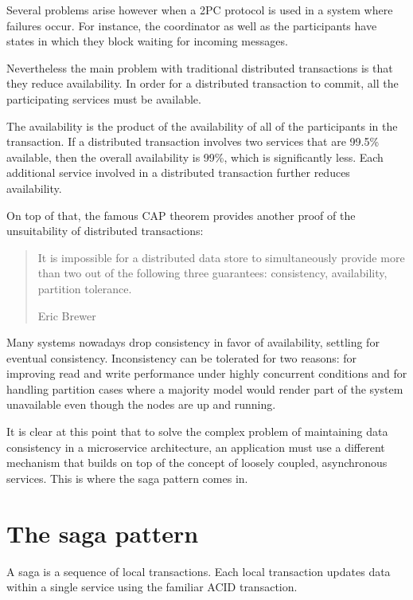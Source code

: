 \documentclass[conference]{IEEEtran}
\begin{document}
Several problems arise however when a 2PC protocol is used in a system where failures occur. For instance, the coordinator as well as the participants have states in which they block waiting for incoming messages. \cite{distributed-systems-2pc}

Nevertheless the main problem with traditional distributed transactions is that they reduce availability. In order for a distributed transaction to commit, all the participating services must be available.

The availability is the product of the availability of all of the participants in the transaction. If a distributed transaction involves two services that are 99.5\% available, then the overall availability is 99\%, which is significantly less. Each additional service involved in a distributed transaction further reduces availability.

On top of that, the famous CAP theorem provides another proof of the unsuitability of distributed transactions:

\begin{quote}
It is impossible for a distributed data store to simultaneously provide more than two out of the following three guarantees: consistency, availability, partition tolerance.

\hfill Eric Brewer
\end{quote}
 

Many systems nowadays drop consistency in favor of availability, settling for eventual consistency. Inconsistency can be tolerated for two reasons: for improving read and write performance under highly concurrent conditions and for handling partition cases where a majority model would render part of the system unavailable even though the nodes are up and running. \cite{consistency-vs-availability}

It is clear at this point that to solve the complex problem of maintaining data consistency in a microservice architecture, an application must use a different mechanism that builds on top of the concept of loosely coupled, asynchronous services. This is where the saga pattern comes in.

\section{The saga pattern}

A saga is a sequence of local transactions. Each local transaction updates data within a single service using the familiar ACID transaction.
\end{document}
